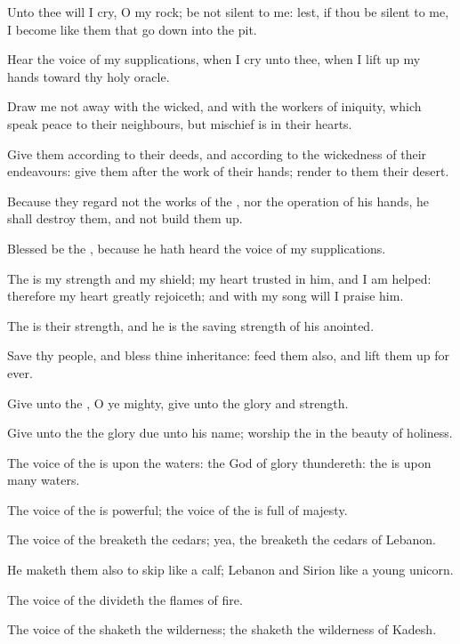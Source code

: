 \Chapter
\Verse Unto thee will I cry, O \LORD my rock; be not silent to me: lest, if thou be silent to me, I become like them that go down into the pit.

\Verse Hear the voice of my supplications, when I cry unto thee, when I lift up my hands toward thy holy oracle.

\Verse Draw me not away with the wicked, and with the workers of iniquity, which speak peace to their neighbours, but mischief is in their hearts.

\Verse Give them according to their deeds, and according to the wickedness of their endeavours: give them after the work of their hands; render to them their desert.

\Verse Because they regard not the works of the \LORD, nor the operation of his hands, he shall destroy them, and not build them up.

\Verse Blessed be the \LORD, because he hath heard the voice of my supplications.

\Verse The \LORD is my strength and my shield; my heart trusted in him, and I am helped: therefore my heart greatly rejoiceth; and with my song will I praise him.

\Verse The \LORD is their strength, and he is the saving strength of his anointed.

\Verse Save thy people, and bless thine inheritance: feed them also, and lift them up for ever.




\Chapter
\Verse Give unto the \LORD, O ye mighty, give unto the \LORD glory and strength.

\Verse Give unto the \LORD the glory due unto his name; worship the \LORD in the beauty of holiness.

\Verse The voice of the \LORD is upon the waters: the God of glory thundereth: the \LORD is upon many waters.

\Verse The voice of the \LORD is powerful; the voice of the \LORD is full of majesty.

\Verse The voice of the \LORD breaketh the cedars; yea, the \LORD breaketh the cedars of Lebanon.

\Verse He maketh them also to skip like a calf; Lebanon and Sirion like a young unicorn.

\Verse The voice of the \LORD divideth the flames of fire.

\Verse The voice of the \LORD shaketh the wilderness; the \LORD shaketh the wilderness of Kadesh.

